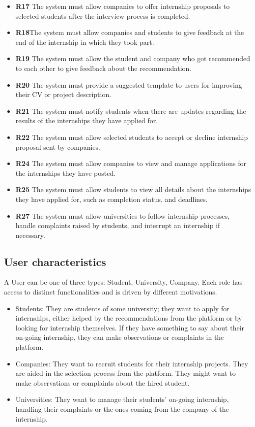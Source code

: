 \documentclass{article}
\begin{document}
\begin{itemize}
        \item \textbf{R17} The system must allow companies to offer internship proposals to selected students after the interview process is completed.
        \item \textbf{R18}The system must allow companies and students to give feedback at the end of the internship in which they took part.
        \item \textbf{R19} The system must allow the student and company who got recommended to each other to give feedback about the recommendation.
        \item \textbf{R20} The system must provide a suggested template to users for improving their CV or project description.
        \item \textbf{R21} The system must notify students when there are updates regarding the results of the internships they have applied for.
        \item \textbf{R22} The system must allow selected students to accept or decline internship proposal sent by companies.    
        \item \textbf{R24} The system must allow companies to view and manage applications for the internships they have posted.
        \item \textbf{R25} The system must allow students to view all details about the internships they have applied for, such as completion status, and deadlines.
        \item \textbf{R27} The system must allow universities to follow internship processes, handle complaints raised by students, and interrupt an internship if necessary.
        
        \end{itemize}
\subsection{User characteristics}
     A User can be one of three types: Student, University, Company. Each role has access to distinct functionalities and is driven by different motivations.
     \begin{itemize}
        \item Students: They are students of some university; they want to apply for internships, either helped by the recommendations from the platform or by looking for internship themselves. If they have something to say about their on-going internship, they can make observations or complaints in the platform.
        \item Companies: They want to recruit students for their internship projects. They are aided in the selection process from the platform. They might want to make observations or complaints about the hired student.
        \item Universities: They want to manage their students' on-going internship, handling their complaints or the ones coming from the company of the internship.     
     \end{itemize}
\end{document}
